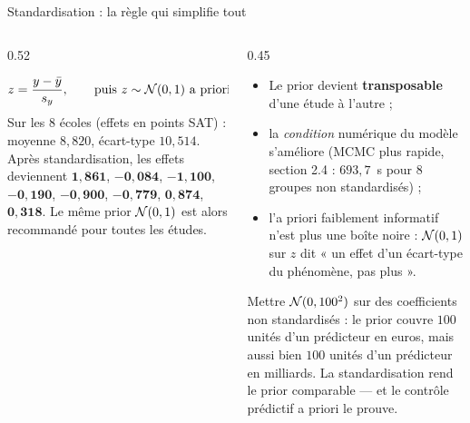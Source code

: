 \begin{frame}{Standardisation : la règle qui simplifie tout}
\footnotesize
\begin{columns}[t]
\begin{column}{0.52\textwidth}
\begin{ebox}
\[
z = \frac{y - \bar y}{s_y}, \qquad
\text{puis } z \sim \mathcal{N}(0, 1) \text{ a priori}
\]
Sur les 8 écoles (effets en points SAT) : moyenne $8{,}820$, écart-type
$10{,}514$. Après standardisation, les effets deviennent
$\mathbf{1{,}861}$, $\mathbf{-0{,}084}$, $\mathbf{-1{,}100}$, $\mathbf{-0{,}190}$,
$\mathbf{-0{,}900}$, $\mathbf{-0{,}779}$, $\mathbf{0{,}874}$, $\mathbf{0{,}318}$.
Le même prior $\mathcal{N}(0,1)$ est alors recommandé pour toutes les études.
\end{ebox}
\end{column}
\begin{column}{0.45\textwidth}
\begin{kbox}
\begin{itemize}
  \item Le prior devient \textbf{transposable} d'une étude à l'autre ;
  \item la \emph{condition} numérique du modèle s'améliore (MCMC plus rapide,
        section 2.4 : $693{,}7$~s pour $8$ groupes non standardisés) ;
  \item l'a priori faiblement informatif n'est plus une boîte noire :
        $\mathcal{N}(0,1)$ sur $z$ dit « un effet d'un écart-type du phénomène, pas plus ».
\end{itemize}
\end{kbox}
\begin{wbox}
Mettre $\mathcal{N}(0, 100^2)$ sur des coefficients non standardisés : le prior couvre
$100$ unités d'un prédicteur en euros, mais aussi bien $100$ unités d'un
prédicteur en milliards. La standardisation rend le prior comparable — et le
contrôle prédictif a priori le prouve.
\end{wbox}
\end{column}
\end{columns}
\end{frame}

